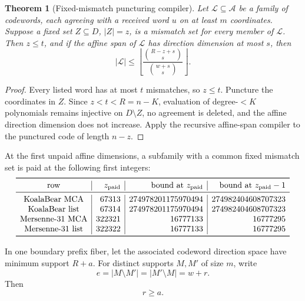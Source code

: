 \documentclass[11pt,a4paper]{amsart}
\numberwithin{equation}{section}
\newtheorem{theorem}{Theorem}[section]
\theoremstyle{remark}
\begin{document}
\begin{theorem}[Fixed-mismatch puncturing compiler]
\label{thm:fixed-mismatch-puncturing}
Let $\mathcal L\subseteq\mathcal A$ be a family of codewords, each agreeing with a received word $u$ on at least $m$ coordinates.  Suppose a fixed set $Z\subseteq D$, $|Z|=z$, is a mismatch set for every member of $\mathcal L$.  Then $z\le t$, and if the affine span of $\mathcal L$ has direction dimension at most $s$, then
\begin{equation}
 \boxed{
 |\mathcal L|
 \le
 \left\lfloor
 \frac{\binom{R-z+s}{s}}
      {\binom{w+s}{s}}
 \right\rfloor .
 }
 \label{eq:fixed-mismatch-puncturing}
\end{equation}
\end{theorem}

\begin{proof}
Every listed word has at most $t$ mismatches, so $z\le t$.  Puncture the coordinates in $Z$.  Since $z<t<R=n-K$, evaluation of degree-$<K$ polynomials remains injective on $D\setminus Z$, no agreement is deleted, and the affine direction dimension does not increase.  Apply the recursive affine-span compiler to the punctured code of length $n-z$.
\end{proof}

\begin{corollary}
\label{cor:active-puncture-thresholds}
At the first unpaid affine dimensions, a subfamily with a common fixed mismatch set is paid at the following first integers:
\[
\begin{array}{c|r|r|r}
\toprule
\text{row}&z_{\rm paid}&\text{bound at }z_{\rm paid}&\text{bound at }z_{\rm paid}-1\\
\midrule
\text{KoalaBear MCA}&67313&274978201175970494&274982404608707323\\
\text{KoalaBear list}&67314&274978201175970494&274982404608707323\\
\text{Mersenne-31 MCA}&322321&16777133&16777295\\
\text{Mersenne-31 list}&322322&16777133&16777295\\
\bottomrule
\end{array}
\]
\end{corollary}

\begin{proposition}
\label{prop:exchange-defect}
In one boundary prefix fiber, let the associated codeword direction space have minimum support $R+a$.  For distinct supports $M,M'$ of size $m$, write
\[
 e=|M\setminus M'|=|M'\setminus M|=w+r.
\]
Then
\begin{equation}
 \boxed{r\ge a.}
 \label{eq:exchange-defect}
\end{equation}
\end{proposition}
\end{document}
